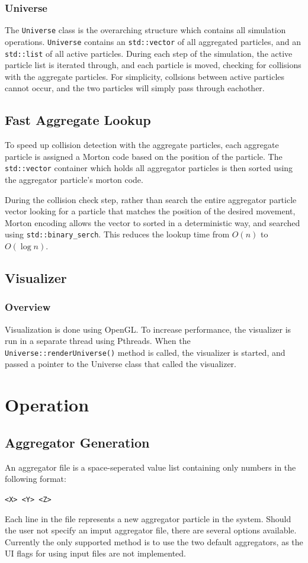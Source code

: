 \documentclass[fleqn,10pt]{SelfArx} %
\begin{document}
\subsubsection{Universe}
The \texttt{Universe} class is the overarching structure which contains all simulation operations. \texttt{Universe} contains an \texttt{std\allowbreak::vector} of all aggregated particles, and an \texttt{std\allowbreak::list} of all active particles. During each step of the simulation, the active particle list is iterated through, and each particle is moved, checking for collisions with the aggregate particles. For simplicity, collsions between active particles cannot occur, and the two particles will simply pass through eachother. 

\subsection{Fast Aggregate Lookup}
To speed up collision detection with the aggregate particles, each aggregate particle is assigned a Morton code based on the position of the particle. The \texttt{std\allowbreak::vector} container which holds all aggregator particles is then sorted using the aggregator particle's morton code.

During the collision check step, rather than search the entire aggregator particle vector looking for a particle that matches the position of the desired movement, Morton encoding allows the vector to sorted in a deterministic way, and searched using \texttt{std\allowbreak::binary\_serch}. This reduces the lookup time from $O(n)$ to $O(\log n)$.
\subsection{Visualizer}
\subsubsection{Overview}
Visualization is done using OpenGL. To increase performance, the visualizer is run in a separate thread using Pthreads. When the \texttt{Universe\allowbreak::renderUniverse()} method is called, the visualizer is started, and passed a pointer to the Universe class that called the visualizer.



\section{Operation}
\subsection{Aggregator Generation}
An aggregator file is a space-seperated value list containing only numbers in the following format:
\begin{center}
    \texttt{<X> <Y> <Z>}
\end{center}
Each line in the file represents a new aggregator particle in the system. Should the user not specify an imput aggregator file, there are several options available. Currently the only supported method is to use the two default aggregators, as the UI flags for using input files are not implemented.
\end{document}

